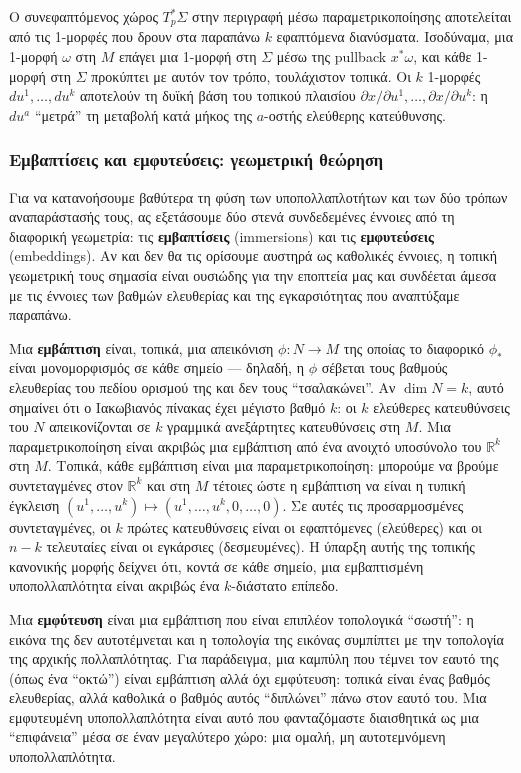 \documentclass[11pt,a4paper,twoside,openright]{book}
\begin{document}
Ο συνεφαπτόμενος χώρος $T_p^*\Sigma$ στην περιγραφή μέσω παραμετρικοποίησης αποτελείται από τις 1-μορφές που δρουν στα παραπάνω $k$ εφαπτόμενα διανύσματα. Ισοδύναμα, μια 1-μορφή $\omega$ στη $M$ επάγει μια 1-μορφή στη $\Sigma$ μέσω της pullback $x^*\omega$, και κάθε 1-μορφή στη $\Sigma$ προκύπτει με αυτόν τον τρόπο, τουλάχιστον τοπικά. Οι $k$ 1-μορφές $du^1, \dots, du^k$ αποτελούν τη δυϊκή βάση του τοπικού πλαισίου $\partial x / \partial u^1, \dots, \partial x / \partial u^k$: η $du^a$ ``μετρά'' τη μεταβολή κατά μήκος της $a$-οστής ελεύθερης κατεύθυνσης.

\subsubsection{Εμβαπτίσεις και εμφυτεύσεις: γεωμετρική θεώρηση}

Για να κατανοήσουμε βαθύτερα τη φύση των υποπολλαπλοτήτων και των δύο τρόπων αναπαράστασής τους, ας εξετάσουμε δύο στενά συνδεδεμένες έννοιες από τη διαφορική γεωμετρία: τις \textbf{εμβαπτίσεις} (immersions) και τις \textbf{εμφυτεύσεις} (embeddings). Αν και δεν θα τις ορίσουμε αυστηρά ως καθολικές έννοιες, η τοπική γεωμετρική τους σημασία είναι ουσιώδης για την εποπτεία μας και συνδέεται άμεσα με τις έννοιες των βαθμών ελευθερίας και της εγκαρσιότητας που αναπτύξαμε παραπάνω.

Μια \textbf{εμβάπτιση} είναι, τοπικά, μια απεικόνιση $\phi: N \to M$ της οποίας το διαφορικό $\phi_*$ είναι μονομορφισμός σε κάθε σημείο --- δηλαδή, η $\phi$ σέβεται τους βαθμούς ελευθερίας του πεδίου ορισμού της και δεν τους ``τσαλακώνει''. Αν $\dim N = k$, αυτό σημαίνει ότι ο Ιακωβιανός πίνακας έχει μέγιστο βαθμό $k$: οι $k$ ελεύθερες κατευθύνσεις του $N$ απεικονίζονται σε $k$ γραμμικά ανεξάρτητες κατευθύνσεις στη $M$. Μια παραμετρικοποίηση είναι ακριβώς μια εμβάπτιση από ένα ανοιχτό υποσύνολο του $\mathbb{R}^k$ στη $M$. Τοπικά, κάθε εμβάπτιση είναι μια παραμετρικοποίηση: μπορούμε να βρούμε συντεταγμένες στον $\mathbb{R}^k$ και στη $M$ τέτοιες ώστε η εμβάπτιση να είναι η τυπική έγκλειση $(u^1, \dots, u^k) \mapsto (u^1, \dots, u^k, 0, \dots, 0)$. Σε αυτές τις προσαρμοσμένες συντεταγμένες, οι $k$ πρώτες κατευθύνσεις είναι οι εφαπτόμενες (ελεύθερες) και οι $n-k$ τελευταίες είναι οι εγκάρσιες (δεσμευμένες). Η ύπαρξη αυτής της τοπικής κανονικής μορφής δείχνει ότι, κοντά σε κάθε σημείο, μια εμβαπτισμένη υποπολλαπλότητα είναι ακριβώς ένα $k$-διάστατο επίπεδο.

Μια \textbf{εμφύτευση} είναι μια εμβάπτιση που είναι επιπλέον τοπολογικά ``σωστή'': η εικόνα της δεν αυτοτέμνεται και η τοπολογία της εικόνας συμπίπτει με την τοπολογία της αρχικής πολλαπλότητας. Για παράδειγμα, μια καμπύλη που τέμνει τον εαυτό της (όπως ένα ``οκτώ'') είναι εμβάπτιση αλλά όχι εμφύτευση: τοπικά είναι ένας βαθμός ελευθερίας, αλλά καθολικά ο βαθμός αυτός ``διπλώνει'' πάνω στον εαυτό του. Μια εμφυτευμένη υποπολλαπλότητα είναι αυτό που φανταζόμαστε διαισθητικά ως μια ``επιφάνεια'' μέσα σε έναν μεγαλύτερο χώρο: μια ομαλή, μη αυτοτεμνόμενη υποπολλαπλότητα.
\end{document}
